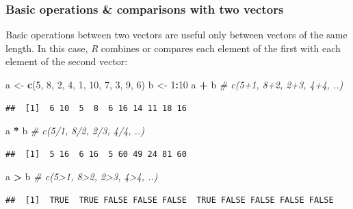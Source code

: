 \documentclass[
]{scrartcl}
\newenvironment{Shaded}{\begin{snugshade}}{\end{snugshade}}
\newcommand{\CommentTok}[1]{\textcolor[rgb]{0.56,0.35,0.01}{\textit{#1}}}
\newcommand{\DecValTok}[1]{\textcolor[rgb]{0.00,0.00,0.81}{#1}}
\newcommand{\FunctionTok}[1]{\textcolor[rgb]{0.13,0.29,0.53}{\textbf{#1}}}
\newcommand{\NormalTok}[1]{#1}
\newcommand{\OtherTok}[1]{\textcolor[rgb]{0.56,0.35,0.01}{#1}}
\newcommand{\SpecialCharTok}[1]{\textcolor[rgb]{0.81,0.36,0.00}{\textbf{#1}}}
\begin{document}
\hypertarget{basic-operations-comparisons-with-two-vectors}{%
\subsubsection{Basic operations \& comparisons with two vectors}\label{basic-operations-comparisons-with-two-vectors}}

Basic operations between two vectors are useful only between vectors of the same length. In this case, \emph{R} combines or compares each element of the first with each element of the second vector:

\begin{Shaded}
\begin{Highlighting}[]
\NormalTok{a }\OtherTok{\textless{}{-}} \FunctionTok{c}\NormalTok{(}\DecValTok{5}\NormalTok{, }\DecValTok{8}\NormalTok{, }\DecValTok{2}\NormalTok{, }\DecValTok{4}\NormalTok{, }\DecValTok{1}\NormalTok{, }\DecValTok{10}\NormalTok{, }\DecValTok{7}\NormalTok{, }\DecValTok{3}\NormalTok{, }\DecValTok{9}\NormalTok{, }\DecValTok{6}\NormalTok{)}
\NormalTok{b }\OtherTok{\textless{}{-}} \DecValTok{1}\SpecialCharTok{:}\DecValTok{10}
\NormalTok{a }\SpecialCharTok{+}\NormalTok{ b    }\CommentTok{\# c(5+1, 8+2, 2+3, 4+4, ..)}
\end{Highlighting}
\end{Shaded}

\begin{verbatim}
##  [1]  6 10  5  8  6 16 14 11 18 16
\end{verbatim}

\begin{Shaded}
\begin{Highlighting}[]
\NormalTok{a }\SpecialCharTok{*}\NormalTok{ b    }\CommentTok{\# c(5/1, 8/2, 2/3, 4/4, ..)}
\end{Highlighting}
\end{Shaded}

\begin{verbatim}
##  [1]  5 16  6 16  5 60 49 24 81 60
\end{verbatim}

\begin{Shaded}
\begin{Highlighting}[]
\NormalTok{a }\SpecialCharTok{\textgreater{}}\NormalTok{ b    }\CommentTok{\# c(5\textgreater{}1, 8\textgreater{}2, 2\textgreater{}3, 4\textgreater{}4, ..)}
\end{Highlighting}
\end{Shaded}

\begin{verbatim}
##  [1]  TRUE  TRUE FALSE FALSE FALSE  TRUE FALSE FALSE FALSE FALSE
\end{verbatim}
\end{document}
